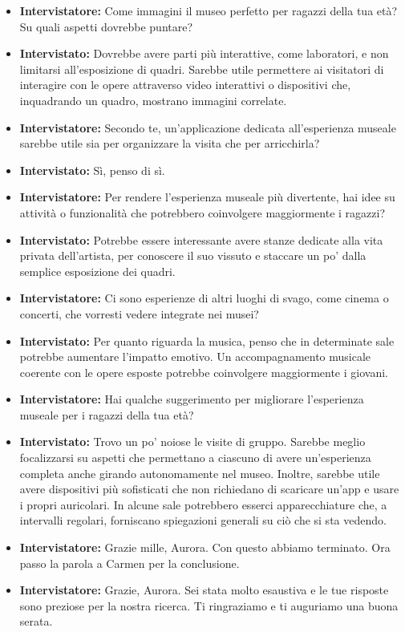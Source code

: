 \documentclass{article}
\begin{document}
\begin{itemize}
    \item \textbf{Intervistatore:} Come immagini il museo perfetto per ragazzi della tua età? Su quali aspetti dovrebbe puntare?
    
    \item \textbf{Intervistato:} Dovrebbe avere parti più interattive, come laboratori, e non limitarsi all’esposizione di quadri. Sarebbe utile permettere ai visitatori di interagire con le opere attraverso video interattivi o dispositivi che, inquadrando un quadro, mostrano immagini correlate.
    
    \item \textbf{Intervistatore:} Secondo te, un’applicazione dedicata all’esperienza museale sarebbe utile sia per organizzare la visita che per arricchirla?
    
    \item \textbf{Intervistato:} Sì, penso di sì.
    
    \item \textbf{Intervistatore:} Per rendere l’esperienza museale più divertente, hai idee su attività o funzionalità che potrebbero coinvolgere maggiormente i ragazzi?
    
    \item \textbf{Intervistato:} Potrebbe essere interessante avere stanze dedicate alla vita privata dell’artista, per conoscere il suo vissuto e staccare un po’ dalla semplice esposizione dei quadri.
    
    \item \textbf{Intervistatore:} Ci sono esperienze di altri luoghi di svago, come cinema o concerti, che vorresti vedere integrate nei musei?
    
    \item \textbf{Intervistato:} Per quanto riguarda la musica, penso che in determinate sale potrebbe aumentare l’impatto emotivo. Un accompagnamento musicale coerente con le opere esposte potrebbe coinvolgere maggiormente i giovani.
    
    \item \textbf{Intervistatore:} Hai qualche suggerimento per migliorare l’esperienza museale per i ragazzi della tua età?
    
    \item \textbf{Intervistato:} Trovo un po’ noiose le visite di gruppo. Sarebbe meglio focalizzarsi su aspetti che permettano a ciascuno di avere un’esperienza completa anche girando autonomamente nel museo. Inoltre, sarebbe utile avere dispositivi più sofisticati che non richiedano di scaricare un’app e usare i propri auricolari. In alcune sale potrebbero esserci apparecchiature che, a intervalli regolari, forniscano spiegazioni generali su ciò che si sta vedendo.
    
    \item \textbf{Intervistatore:} Grazie mille, Aurora. Con questo abbiamo terminato. Ora passo la parola a Carmen per la conclusione.
    
    \item \textbf{Intervistatore:} Grazie, Aurora. Sei stata molto esaustiva e le tue risposte sono preziose per la nostra ricerca. Ti ringraziamo e ti auguriamo una buona serata.
    
\end{itemize}
\end{document}
